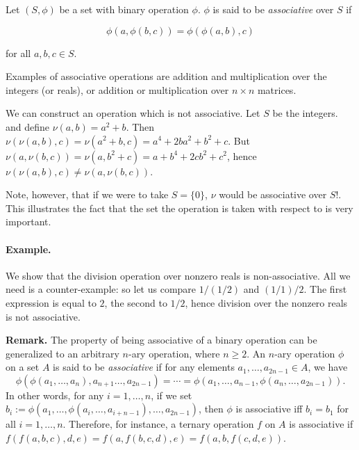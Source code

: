 \documentclass{article}
\begin{document}
Let $(S,\phi)$ be a set with binary operation $\phi$.  $\phi$ is said to be \emph{associative} over $S$ if 

$$ \phi(a,\phi(b,c)) = \phi(\phi(a,b),c) $$

for all $a,b,c \in S$.  

Examples of associative operations are addition and multiplication over the integers (or reals), or addition or multiplication over $n \times n$ matrices.

We can construct an operation which is not associative.  Let $S$ be the integers.  and define $\nu(a,b)=a^2+b$.  Then $\nu(\nu(a,b),c)=\nu(a^2+b,c)=a^4+2ba^2+b^2+c$.  But $\nu(a,\nu(b,c))=\nu(a,b^2+c)=a+b^4+2cb^2+c^2$, hence $\nu(\nu(a,b),c) \ne \nu(a,\nu(b,c))$. 

Note, however, that if we were to take $S=\{0\}$, $\nu$ would be associative over $S$!.  This illustrates the fact that the set the operation is taken with respect to is very important.

\paragraph{Example.}

We show that the division operation over nonzero reals is non-associative.  All we need is a counter-example: so let us compare $1/(1/2)$ and $(1/1)/2$.  The first expression is equal to $2$, the second to $1/2$, hence division over the nonzero reals is not associative.

\textbf{Remark.}  The property of being associative of a binary operation can be generalized to an arbitrary $n$-ary operation, where $n\ge 2$.  An $n$-ary operation $\phi$ on a set $A$ is said to be \emph{associative} if for any elements $a_1,\ldots, a_{2n-1} \in A$, we have
$$\phi(\phi(a_1,\ldots, a_n), a_{n+1} \ldots, a_{2n-1}) = \cdots = \phi(a_1, \ldots, a_{n-1}, \phi(a_n,\ldots, a_{2n-1})).$$
In other words, for any $i=1,\ldots, n$, if we set $b_i:=\phi (a_1,\ldots, \phi(a_i,\ldots, a_{i+n-1}),\ldots, a_{2n-1})$, then $\phi$ is associative iff $b_i=b_1$ for all $i=1,\ldots, n$.  Therefore, for instance, a ternary operation $f$ on $A$ is associative if $f(f(a,b,c),d,e)=f(a,f(b,c,d),e)=f(a,b,f(c,d,e))$.
\end{document}
